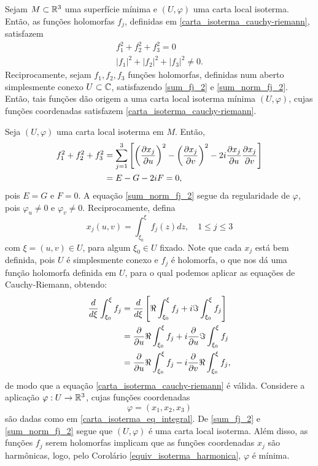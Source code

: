 \begin{lema}\label{lema_fj_2}
	Sejam $M \subset \mathbb{R}^3$ uma superfície mínima e $(U, \varphi)$ uma carta local isoterma. Então, as funções holomorfas $f_j$, definidas em \eqref{carta_isoterma_cauchy-riemann}, satisfazem
	\begin{gather}\label{sum_fj_2}
	f_1^2 + f_2^2 + f_3^2 = 0\\ \label{sum_norm_fj_2}
	|f_1|^2 + |f_2|^2 + |f_3|^2 \neq 0.
	\end{gather}
	Reciprocamente, sejam $f_1, f_2, f_3$ funções holomorfas, definidas num aberto simplesmente conexo $U \subset \mathbb{C}$, satisfazendo \eqref{sum_fj_2} e \eqref{sum_norm_fj_2}. Então, tais funções dão origem a uma carta local isoterma mínima $(U, \varphi)$, cujas funções coordenadas satisfazem \eqref{carta_isoterma_cauchy-riemann}.
\end{lema}

\begin{demonstracao}
	Seja $(U, \varphi)$ uma carta local isoterma em $M$. Então,
	\begin{align*}
	f_1^2 + f_2^2 + f_3^2 &= \sum_{j=1}^{3} \left[ \left( \frac{\partial x_j}{\partial u} \right)^2 - \left( \frac{\partial x_j}{\partial v} \right)^2 - 2i \frac{\partial x_j}{\partial u} \frac{\partial x_j}{\partial v} \right]\\
	&= E - G - 2iF = 0,
	\end{align*}
	pois $E=G$ e $F=0$. A equação \eqref{sum_norm_fj_2} segue da regularidade de $\varphi$, pois $\varphi_u \neq 0$ e $\varphi_v \neq 0$.
	Reciprocamente, defina
	\begin{equation}\label{carta_isoterma_eq_integral}
	x_j(u,v) = \int_{\xi_0}^{\xi} f_j(z) dz, \quad 1 \leq j \leq 3
	\end{equation}
	com $\xi = (u,v) \in U$, para algum $\xi_0 \in U$ fixado. Note que cada $x_j$ está bem definida, pois $U$ é simplesmente conexo e $f_j$ é holomorfa, o que nos dá uma função holomorfa definida em $U$, para o qual podemos aplicar as equações de Cauchy-Riemann, obtendo:
	\begin{align*}
	\frac{d}{d \xi} \int_{\xi_0}^{\xi} f_j &= \frac{d}{d \xi} \left[ \Re \int_{\xi_0}^{\xi} f_j + i \Im \int_{\xi_0}^{\xi} f_j \right]\\
	&= \frac{\partial}{\partial u} \Re \int_{\xi_0}^{\xi} f_j + i \frac{\partial}{\partial u} \Im \int_{\xi_0}^{\xi} f_j\\
	&= \frac{\partial}{\partial u} \Re \int_{\xi_0}^{\xi} f_j - i \frac{\partial}{\partial v} \Re \int_{\xi_0}^{\xi} f_j,
	\end{align*}
	de modo que a equação \eqref{carta_isoterma_cauchy-riemann} é válida. Considere a aplicação $\varphi: U \rightarrow \mathbb{R}^3$, cujas funções coordenadas
	\begin{equation*}
	\varphi = (x_1,x_2,x_3)
	\end{equation*}
	são dadas como em \eqref{carta_isoterma_eq_integral}. De \eqref{sum_fj_2} e \eqref{sum_norm_fj_2} segue que $(U,\varphi)$ é uma carta local isoterma. Além disso, as funções $f_j$ serem holomorfas implicam que as funções coordenadas $x_j$ são harmônicas, logo, pelo Corolário \ref{equiv_isoterma_harmonica}, $\varphi$ é mínima.
\end{demonstracao}


